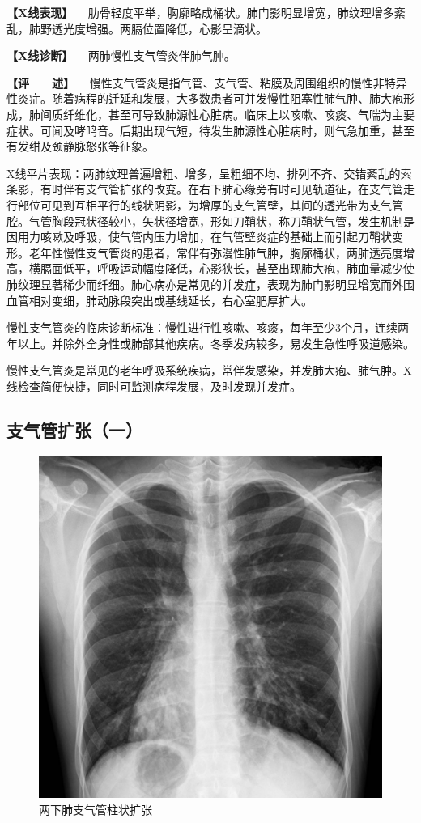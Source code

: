 \textbf{【X线表现】}
　肋骨轻度平举，胸廓略成桶状。肺门影明显增宽，肺纹理增多紊乱，肺野透光度增强。两膈位置降低，心影呈滴状。

\textbf{【X线诊断】} 　两肺慢性支气管炎伴肺气肿。

\textbf{【评　　述】}
　慢性支气管炎是指气管、支气管、粘膜及周围组织的慢性非特异性炎症。随着病程的迁延和发展，大多数患者可并发慢性阻塞性肺气肿、肺大疱形成，肺间质纤维化，甚至可导致肺源性心脏病。临床上以咳嗽、咳痰、气喘为主要症状。可闻及哮鸣音。后期出现气短，待发生肺源性心脏病时，则气急加重，甚至有发绀及颈静脉怒张等征象。

X线平片表现：两肺纹理普遍增粗、增多，呈粗细不均、排列不齐、交错紊乱的索条影，有时伴有支气管扩张的改变。在右下肺心缘旁有时可见轨道征，在支气管走行部位可见到互相平行的线状阴影，为增厚的支气管壁，其间的透光带为支气管腔。气管胸段冠状径较小，矢状径增宽，形如刀鞘状，称刀鞘状气管，发生机制是因用力咳嗽及呼吸，使气管内压力增加，在气管壁炎症的基础上而引起刀鞘状变形。老年性慢性支气管炎的患者，常伴有弥漫性肺气肿，胸廓桶状，两肺透亮度增高，横膈面低平，呼吸运动幅度降低，心影狭长，甚至出现肺大疱，肺血量减少使肺纹理显著稀少而纤细。肺心病亦是常见的并发症，表现为肺门影明显增宽而外围血管相对变细，肺动脉段突出或基线延长，右心室肥厚扩大。

慢性支气管炎的临床诊断标准：慢性进行性咳嗽、咳痰，每年至少3个月，连续两年以上。并除外全身性或肺部其他疾病。冬季发病较多，易发生急性呼吸道感染。

慢性支气管炎是常见的老年呼吸系统疾病，常伴发感染，并发肺大疱、肺气肿。X线检查简便快捷，同时可监测病程发展，及时发现并发症。

\subsection{支气管扩张（一）}

\begin{figure}[!htbp]
 \centering
 \includegraphics{./images/Image00141.jpg}
 \captionsetup{justification=centering}
 \caption{两下肺支气管柱状扩张}
 \label{fig3-2-5}
  \end{figure} 

